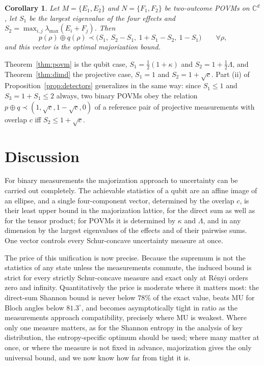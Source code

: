 \documentclass[11pt]{article}
\newtheorem{corollary}{Corollary}
\theoremstyle{definition}
\newcommand{\maj}{\prec}
\newcommand{\sqc}{\sqrt{c}}
\begin{document}
\begin{corollary}\label{cor:povmd}
Let $M=\{E_1,E_2\}$ and $N=\{F_1,F_2\}$ be two-outcome POVMs on $\mathbb C^d$, let $S_1$
be the largest eigenvalue of the four effects and
$S_2=\max_{i,j}\lambda_{\max}(E_i+F_j)$. Then
\begin{equation}
  p(\rho)\oplus q(\rho)\maj\bigl(S_1,\ S_2-S_1,\ 1+S_1-S_2,\ 1-S_1\bigr)\qquad\forall\rho,
  \label{eq:povmd}
\end{equation}
and this vector is the optimal majorization bound.
\end{corollary}

Theorem~\ref{thm:povm} is the qubit case, $S_1=\frac12(1+\kappa)$ and
$S_2=1+\frac12\Lambda$, and Theorem~\ref{thm:dimd} the projective case, $S_1=1$
and $S_2=1+\sqc$. Part (ii) of Proposition~\ref{prop:detectors} generalizes in the
same way: since $S_1\le1$ and $S_3=1+S_1\le2$ always, two binary POVMs obey the
relation $p\oplus q\maj(1,\sqc,1-\sqc,0)$ of a reference pair of projective
measurements with overlap $c$ iff $S_2\le1+\sqc$.

\section*{Discussion}

For binary measurements the majorization approach to uncertainty can be carried
out completely. The achievable statistics of a qubit are an affine image of an
ellipse, and a single four-component vector, determined by the overlap $c$, is
their least upper bound in the majorization lattice, for the direct sum as well
as for the tensor product; for POVMs it is determined by $\kappa$ and $\Lambda$, and
in any dimension by the largest eigenvalues of the effects and of their pairwise
sums. One vector controls every Schur-concave uncertainty measure at once.

The price of this unification is now precise. Because the supremum is not the
statistics of any state unless the measurements commute, the induced bound is
strict for every strictly Schur-concave measure and exact only at R\'enyi orders
zero and infinity. Quantitatively the price is moderate where it matters most:
the direct-sum Shannon bound is never below $78\%$ of the exact value, beats MU
for Bloch angles below $81.3^\circ$, and becomes asymptotically tight in ratio as
the measurements approach compatibility, precisely where MU is weakest. Where
only one measure matters, as for the Shannon entropy in the analysis of key
distribution, the entropy-specific optimum should be used; where many matter at
once, or where the measure is not fixed in advance, majorization gives the only
universal bound, and we now know how far from tight it is.
\end{document}
